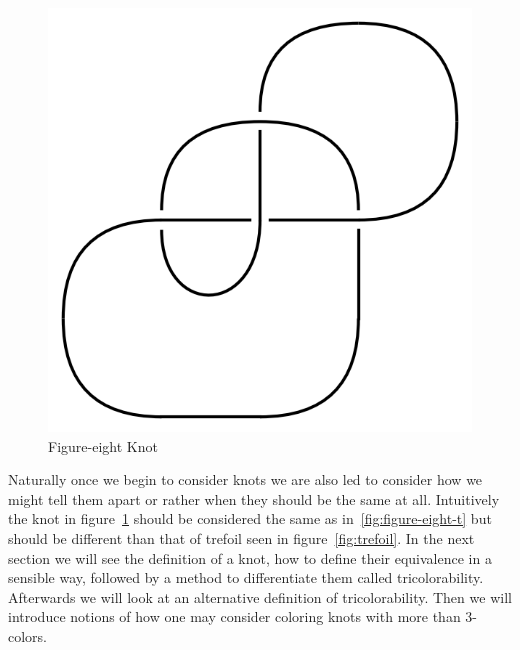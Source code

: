 \documentclass[12pt]{amsart}
\theoremstyle{definition}
\theoremstyle{remark}
\numberwithin{equation}{section}
\newcommand{\ds}{.3}
\begin{document}
\begin{figure}
  \includegraphics[scale=\ds]{figure-eight}
  \caption{Figure-eight Knot}
  \label{fig:figure-eight}
\end{figure}

Naturally once we begin to consider knots we are also led to consider
how we might tell them apart or rather when they should be the same
at all. Intuitively the knot in figure~\ref{fig:figure-eight} should
be considered the same as in~\ref{fig:figure-eight-t} but should be
different than that of trefoil seen in figure~\ref{fig:trefoil}. In
the next section we will see the definition of a knot, how to define their
equivalence in a sensible way, followed by a method to differentiate them
called tricolorability. Afterwards we will look at an alternative definition
of tricolorability. Then we will introduce notions of how one may consider
coloring knots with more than 3-colors.
\end{document}

